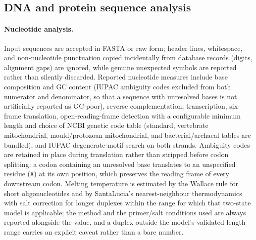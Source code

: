 \subsection{DNA and protein sequence analysis}
\label{sec:core-calculations}

\paragraph{Nucleotide analysis.}
Input sequences are accepted in FASTA or raw form; header lines, whitespace,
and non-nucleotide punctuation copied incidentally from database records
(digits, alignment gaps) are ignored, while genuine unexpected symbols are
reported rather than silently discarded. Reported nucleotide measures
include base composition and GC content (IUPAC ambiguity codes excluded from
both numerator and denominator, so that a sequence with unresolved bases is
not artificially reported as GC-poor), reverse complementation, transcription,
six-frame translation, open-reading-frame detection with a configurable
minimum length and choice of NCBI genetic code table (standard, vertebrate
mitochondrial, mould/protozoan mitochondrial, and bacterial/archaeal tables
are bundled), and IUPAC degenerate-motif search on both strands.
Ambiguity codes are retained in place during translation rather than
stripped before codon splitting: a codon containing an unresolved base
translates to an unspecified residue (\texttt{X}) at its own position,
which preserves the reading frame of every downstream codon. Melting
temperature is estimated by the Wallace rule for short oligonucleotides and
by SantaLucia's nearest-neighbour thermodynamics with salt correction
\citep{santalucia1998} for longer duplexes within the range for which that
two-state model is applicable; the method and the primer/salt conditions
used are always reported alongside the value, and a duplex outside the
model's validated length range carries an explicit caveat rather than a bare
number.

